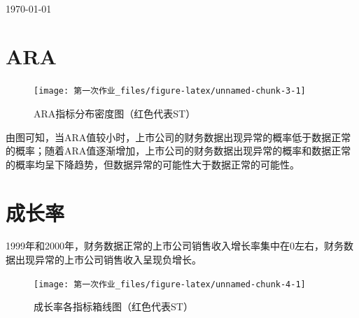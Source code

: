 \documentclass[
  hyperref,]{ctexart}
\begin{document}
\begin{titlepage}
\begin{minipage}{0.4\textwidth}
\end{minipage}\\[2cm]



{\large \today}\\[2cm] %

\vfill %

\end{titlepage}
{
\setcounter{tocdepth}{2}
\tableofcontents
}
\newpage

\hypertarget{ara}{%
\section{ARA}\label{ara}}

\begin{figure}[H]

{\centering \texttt{[image: 第一次作业\_files/figure-latex/unnamed-chunk-3-1]} 

}

\caption{ARA指标分布密度图（红色代表ST）}\label{fig:unnamed-chunk-3}
\end{figure}

由图可知，当ARA值较小时，上市公司的财务数据出现异常的概率低于数据正常的概率；随着ARA值逐渐增加，上市公司的财务数据出现异常的概率和数据正常的概率均呈下降趋势，但数据异常的可能性大于数据正常的可能性。

\hypertarget{ux6210ux957fux7387}{%
\section{成长率}\label{ux6210ux957fux7387}}

1999年和2000年，财务数据正常的上市公司销售收入增长率集中在0左右，财务数据出现异常的上市公司销售收入呈现负增长。

\begin{figure}[H]

{\centering \texttt{[image: 第一次作业\_files/figure-latex/unnamed-chunk-4-1]} 

}

\caption{成长率各指标箱线图（红色代表ST）}\label{fig:unnamed-chunk-4}
\end{figure}
\end{document}
